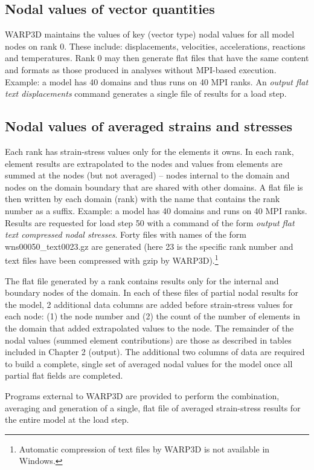 \documentclass[10pt]{report}
\numberwithin{equation}{section}
\newcommand{\ti}{\emph}
\begin{document}
\subsection{Nodal values of vector quantities}
WARP3D maintains the values of key (vector type) nodal values for all model nodes on rank 0.
These include:  displacements, velocities, accelerations, reactions and temperatures.
Rank 0 may then generate flat files that have the same content and formats 
as those produced in analyses without MPI-based
execution. Example: a model has 40 domains and thus runs on 40 MPI ranks. An
\ti{output flat text displacements} command generates a single file of
results for a load step. 

\subsection{Nodal values of averaged strains and stresses}
Each rank has strain-stress values only for the elements it owns. In each 
rank, element results are extrapolated to the
nodes and values from elements are summed at the nodes 
(but not averaged) -- nodes internal to the domain and nodes on the domain
boundary that are shared with other domains.
A flat file is then written by each domain (rank) with the name that contains the rank number as a suffix.
Example: a model has 40 domains and runs on 40 MPI ranks.  Results are requested for load step 50 with a
command of the form \ti{output flat text compressed nodal stresses}. Forty files with names of the form
wns00050\_text0023.gz  are generated (here 23 is the specific rank number and text files 
have been compressed with gzip by WARP3D).\footnote{Automatic compression of text files 
by WARP3D is not available in Windows.}

The flat file generated by a rank contains results only for the internal and boundary nodes of the domain.
In each of these files of {partial} nodal results for the model, 2 additional data columns are added before
strain-stress values for each node: (1) the node number and (2) the count of the number of elements in the
domain that added extrapolated values
to the node. The remainder of the nodal values (summed element contributions)
are those as described in tables included in Chapter 2 (output).
The additional two columns of data are required to build a complete, single
set of averaged nodal values for the model once all partial flat fields are completed.

Programs external to WARP3D are provided to perform the combination, averaging and generation of
a single, flat file of averaged strain-stress results for the entire model at the load step.
\end{document}

